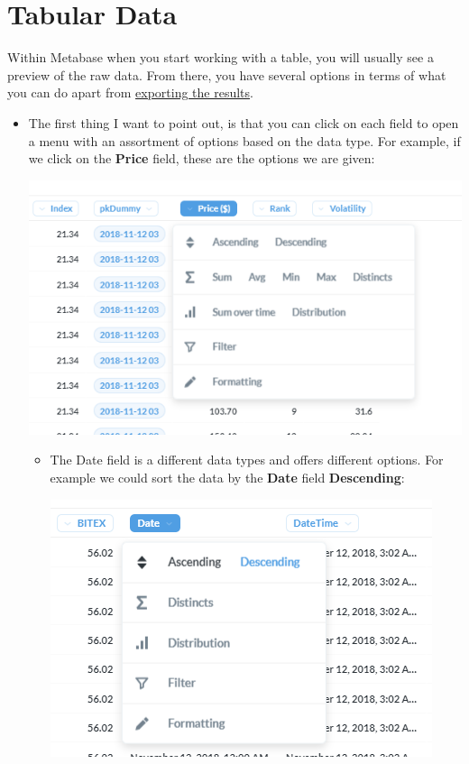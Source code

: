 \documentclass[
]{book}
\begin{document}
\hypertarget{tabular-data}{%
\section{Tabular Data}\label{tabular-data}}

Within Metabase when you start working with a table, you will usually see a preview of the raw data. From there, you have several options in terms of what you can do apart from \protect\hyperlink{exporting-data}{exporting the results}.

\begin{itemize}
\item
  The first thing I want to point out, is that you can click on each field to open a menu with an assortment of options based on the data type. For example, if we click on the \textbf{Price} field, these are the options we are given:

  \includegraphics{images/PriceFieldOptions.png}

  \begin{itemize}
  \item
    The Date field is a different data types and offers different options. For example we could sort the data by the \textbf{Date} field \textbf{Descending}:

    \includegraphics{images/DateDescendingOption.png}


\end{itemize}
\end{itemize}
\end{document}
